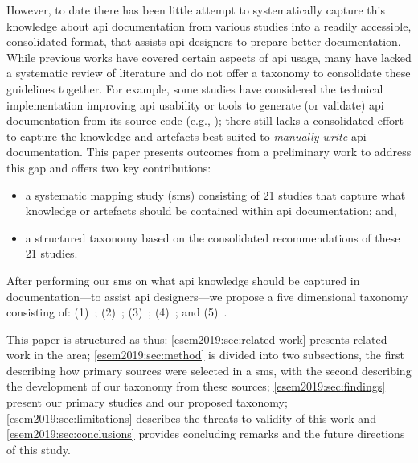 However, to date there has been little attempt to systematically capture this knowledge about \gls{api} documentation from various studies into a readily accessible, consolidated format, that assists \gls{api} designers to prepare better documentation. While previous works have covered certain aspects of \gls{api} usage, many have lacked a systematic review of literature and do not offer a taxonomy to consolidate these guidelines together. For example, some studies have considered the technical implementation improving \gls{api} usability or tools to generate (or validate) \gls{api} documentation from its source code (e.g., \citep{Nybom:2018ef,Watson:2012uy,Maalej:2013uu}); there still lacks a consolidated effort to capture the knowledge and artefacts best suited to \textit{manually write} \gls{api} documentation.
This paper presents outcomes from a preliminary work to address this gap and offers two key contributions:
\begin{itemize}
  \item a systematic mapping study (\gls{sms}) consisting of 21 studies that capture what knowledge or artefacts should be contained within \gls{api} documentation; and,
  \item a structured taxonomy based on the consolidated recommendations of these 21 studies.
\end{itemize}
After performing our \gls{sms} on what \gls{api} knowledge should be captured in documentation---to assist \gls{api} designers---we propose a five dimensional taxonomy consisting of: (1)~\dima{}; (2)~\dimb{}; (3)~\dimc{}; (4)~\dimd{}; and (5)~\dime{}.

This paper is structured as thus: \cref{esem2019:sec:related-work} presents related work in the area; \cref{esem2019:sec:method} is divided into two subsections, the first describing how primary sources were selected in a \gls{sms}, with the second describing the development of our taxonomy from these sources; \cref{esem2019:sec:findings} present our primary studies and our proposed taxonomy; \cref{esem2019:sec:limitations} describes the threats to validity of this work and \cref{esem2019:sec:conclusions} provides concluding remarks and the future directions of this study.

